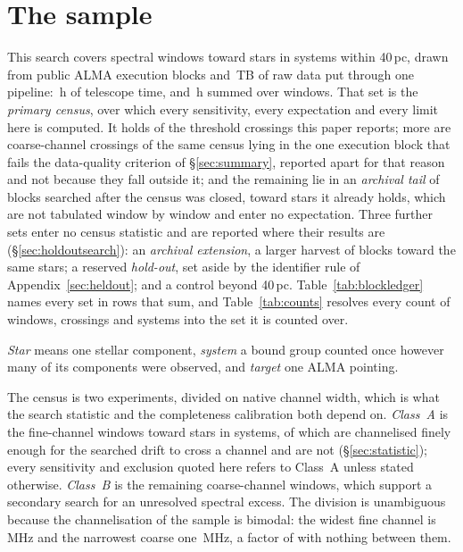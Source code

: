 \section{The sample}
\label{sec:sample}

This search covers \NWindows{} spectral windows toward \NStars{} stars in
\NSystems{} systems within 40\,pc, drawn from \NEB{} public ALMA execution
blocks and \TotalDataTB\,TB of raw data put through one pipeline:
\StTelHours\,h of telescope time, and \LdgCensusHours\,h summed over
windows. That set is the \emph{primary census}, over which every sensitivity,
every expectation and every limit here is computed. It holds \MtCrossACen{} of
the \EvNCrossRaw{} threshold crossings this paper reports; \LdgNCrossB{} more
are coarse-channel crossings of the same census lying in the one execution
block that fails the data-quality criterion of \S\ref{sec:summary}, reported
apart for that reason and not because they fall outside it; and the remaining
\CeNTailCross{} lie in an \emph{archival tail} of blocks searched after the
census was closed, toward stars it already holds, which are not tabulated
window by window and enter no expectation. Three further sets enter no census
statistic and are reported where their results are
(\S\ref{sec:holdoutsearch}): an \emph{archival extension}, a larger harvest of
blocks toward the same stars; a reserved \emph{hold-out}, set aside by the
identifier rule of Appendix~\ref{sec:heldout}; and a control beyond
40\,pc. Table~\ref{tab:blockledger} names every set in rows that sum, and
Table~\ref{tab:counts} resolves every count of windows, crossings and systems
into the set it is counted over.

\emph{Star} means one stellar component, \emph{system} a bound group
counted once however many of its components were observed, and \emph{target}
one ALMA pointing.

The census is two experiments, divided on native channel width, which is what
the search statistic and the completeness calibration both depend on.
\emph{Class~A} is the \NWinA{} fine-channel windows toward \LdgClassAStars{}
stars in \NSysClassA{} systems, of which \EtaDriftAOk{} are channelised finely
enough for the searched drift to cross a channel and \EtaDriftALo{} are not
(\S\ref{sec:statistic}); every sensitivity and exclusion quoted here refers to
Class~A unless stated otherwise. \emph{Class~B} is the remaining \NWinB{}
coarse-channel windows, which support a secondary search for an unresolved
spectral excess. The division is unambiguous because the channelisation of the
sample is bimodal: the widest fine channel is \ScChanFineMaxMHz\,MHz and the
narrowest coarse one \ScChanCoarseMinMHz\,MHz, a factor of \ScChanGapFac{} with
nothing between them.

